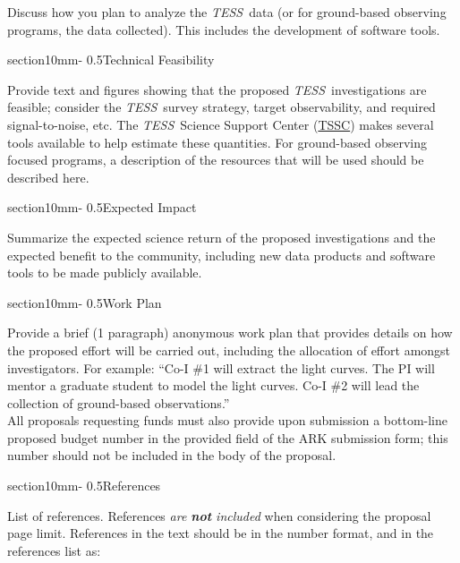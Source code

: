 \documentclass[letterpaper,12pt]{article}
\makeatletter
\renewcommand{\section}{\@startsection%
{section}{1}{0mm}{-\baselineskip}%
{0.5\baselineskip}{\normalfont\Large\bfseries}}%
\newcommand{\tess}{{\it TESS}}
\makeatother
\begin{document}
Discuss how you plan to analyze the \tess\ data (or for ground-based observing programs, the data collected). This includes the development of software tools.

\section{Technical Feasibility}

Provide text and figures showing that the proposed \tess\ investigations are feasible; consider the \tess\ survey strategy, target observability, and required signal-to-noise, etc. The \tess\ Science Support Center (\href{https://heasarc.gsfc.nasa.gov/docs/tess/}{TSSC}) makes several tools available to help estimate these quantities. For ground-based observing focused programs, a description of the resources that will be used should be described here.

\section{Expected Impact}

Summarize the expected science return of the proposed investigations and the expected benefit to the community, including new data products and software tools to be made publicly available.

\section{Work Plan}

Provide a brief (1 paragraph) anonymous work plan that provides details on how the proposed effort will be carried out, including the allocation of effort amongst investigators. For example: ``Co-I \#1 will extract the light curves. The PI will mentor a graduate student to model the light curves. Co-I \#2 will lead the collection of ground-based observations.'' 
\\

\noindent All proposals requesting funds must also provide upon submission a bottom-line proposed budget number in the provided field of the ARK submission form; this number should not be included in the body of the proposal.


\section{References}

List of references. References {\it are {\bf not} included} when considering the
proposal page limit. References in the text should be in the number format, and in the references list as:
\end{document}
